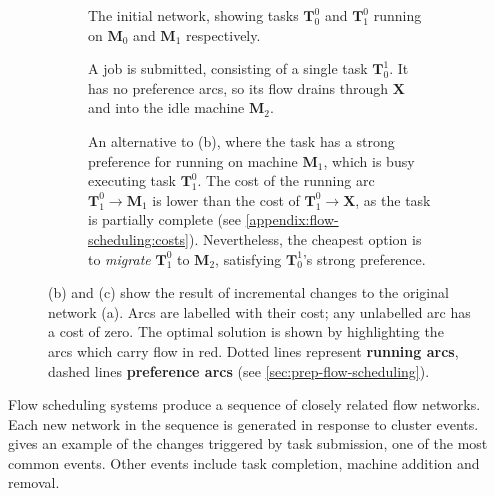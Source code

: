 \begin{figure}
    \centering
    \begin{subfigure}[c]{\textwidth}
        \centering
        
        \vspace*{1em}        
        \caption{The initial network, showing tasks $\mathbf{T}_0^0$ and $\mathbf{T}_1^0$ running on $\mathbf{M}_0$ and $\mathbf{M}_1$ respectively.}
        \vspace*{2em}
    \end{subfigure}
    \begin{subfigure}[c]{\textwidth}
        \centering
        
        \vspace*{1em}
        \caption{A job is submitted, consisting of a single task $\mathbf{T}^1_0$. It has no preference arcs, so its flow drains through $\mathbf{X}$ and into the idle machine $\mathbf{M}_2$.}
        \label{fig:inc-network:new-job-idle}        
        \vspace*{2em}
    \end{subfigure}
    \begin{subfigure}[c]{\textwidth}
        \centering
        
        \vspace*{1em}        
        \caption{An alternative to (b), where the task has a strong preference for running on machine $\mathbf{M}_1$, which is busy executing task $\mathbf{T}_1^0$. The cost of the running arc $\mathbf{T}_1^0 \to \mathbf{M}_1$ is lower than the cost of $\mathbf{T}_1^0 \to \mathbf{X}$, as the task is partially complete (see \cref{appendix:flow-scheduling:costs}). Nevertheless, the cheapest option is to \emph{migrate} $\mathbf{T}_1^0$ to $\mathbf{M}_2$, satisfying $\mathbf{T}_0^1$'s strong preference.}
    \end{subfigure}
    \caption[An incremental change to a scheduling flow network]{(b) and (c) show the result of incremental changes to the original network (a). Arcs are labelled with their cost; any unlabelled arc has a cost of zero. The optimal solution is shown by highlighting the arcs which carry flow in {\color{red} red}. Dotted lines represent \textbf{running arcs}, dashed lines \textbf{preference arcs} (see \cref{sec:prep-flow-scheduling}).}
    \label{fig:inc-network}
\end{figure}


Flow scheduling systems produce a sequence of closely related flow networks. Each new network in the sequence is generated in response to cluster events.  gives an example of the changes triggered by task submission, one of the most common events. Other events include task completion, machine addition and removal.

